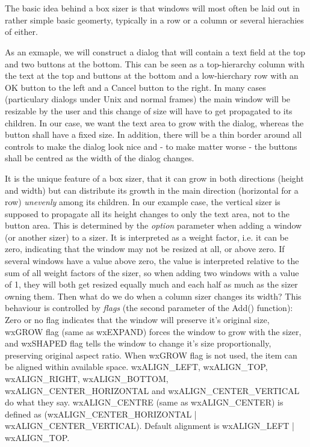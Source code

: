 \section{}\label{wxboxsizer}

The basic idea behind a box sizer is that windows will most often be laid out in rather
simple basic geomerty, typically in a row or a column or several hierachies of either.

As an exmaple, we will construct a dialog that will contain a text field at the top and
two buttons at the bottom. This can be seen as a top-hierarchy column with the text at
the top and buttons at the bottom and a low-hierchary row with an OK button to the left
and a Cancel button to the right. In many cases (particulary dialogs under Unix and
normal frames) the main window will be resizable by the user and this change of size
will have to get propagated to its children. In our case, we want the text area to grow
with the dialog, whereas the button shall have a fixed size. In addition, there will be
a thin border around all controls to make the dialog look nice and - to make matter worse -
the buttons shall be centred as the width of the dialog changes.

It is the unique feature of a box sizer, that it can grow in both directions (height and
width) but can distribute its growth in the main direction (horizontal for a row) {\it unevenly}
among its children. In our example case, the vertical sizer is supposed to propagate all its
height changes to only the text area, not to the button area. This is determined by the {\it option} parameter
when adding a window (or another sizer) to a sizer. It is interpreted
as a weight factor, i.e. it can be zero, indicating that the window may not be resized
at all, or above zero. If several windows have a value above zero, the value is interpreted
relative to the sum of all weight factors of the sizer, so when adding two windows with
a value of 1, they will both get resized equally much and each half as much as the sizer
owning them. Then what do we do when a column sizer changes its width? This behaviour is
controlled by {\it flags} (the second parameter of the Add() function): Zero or no flag
indicates that the window will preserve it's original size, wxGROW flag (same as wxEXPAND)
forces the window to grow with the sizer, and wxSHAPED flag tells the window to change it's
size proportionally, preserving original aspect ratio.  When wxGROW flag is not used,
the item can be aligned within available space.  wxALIGN\_LEFT, wxALIGN\_TOP, wxALIGN\_RIGHT,
wxALIGN\_BOTTOM, wxALIGN\_CENTER\_HORIZONTAL and wxALIGN\_CENTER\_VERTICAL do what they say.
wxALIGN\_CENTRE (same as wxALIGN\_CENTER) is defined as (wxALIGN\_CENTER\_HORIZONTAL |
wxALIGN\_CENTER\_VERTICAL).  Default alignment is wxALIGN\_LEFT | wxALIGN\_TOP.

